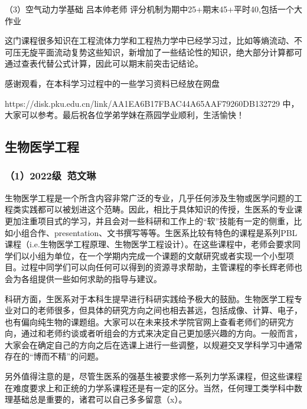 \documentclass[11pt,oneside]{book}
\begin{document}
\vspace{10pt}

（3）空气动力学基础 吕本帅老师
评分机制为期中25+期末45+平时40,包括一个大作业

\vspace{10pt}

这门课程很多知识在工程流体力学和工程热力学中已经学习过，比如等熵流动、不可压无旋平面流动复势这些知识，新增加了一些结论性的知识，绝大部分计算都可通过查表代替公式计算，因此可以期末前突击记结论。

\vspace{10pt}

感谢观看，在本科学习过程中的一些学习资料已经放在网盘

https://disk.pku.edu.cn/link/AA1EA6B17FBAC44A65AAF79260DB132729
中，大家可以参考。最后祝各位学弟学妹在燕园学业顺利，生活愉快！

\subsection{生物医学工程}
\subsubsection{（1）2022级\ 范文琳}

生物医学工程是一个所含内容非常广泛的专业，几乎任何涉及生物或医学问题的工程类实践都可以被划进这个范畴。因此，相比于具体知识的传授，生医系的专业课更加注重项目式的学习，并且会对一些科研和工作上的“软”技能有一定的侧重，比如小组合作、presentation、文书撰写等等。生医系比较有特色的课程是系列PBL课程（i.e.生物医学工程原理、生物医学工程设计）。在这些课程中，老师会要求同学们以小组为单位，在一个学期内完成一个课题的文献研究或者实现一个小型项目。过程中同学们可以向任何可以得到的资源寻求帮助，主管课程的李长辉老师也会为各组提供一些如何求助的指导与建议。

\vspace{10pt}

科研方面，生医系对于本科生提早进行科研实践给予极大的鼓励。生物医学工程专业对口的老师很多，但具体的研究方向之间也相去甚远，包括成像、计算、电子，也有偏向纯生物的课题组。大家可以在未来技术学院官网上查看老师们的研究方向，通过和老师约谈或者听组会的方式来决定自己更加感兴趣的方向。一般而言，大家会在确定自己的方向之后在选课上进行一些调整，以规避交叉学科学习中通常存在的“博而不精”的问题。

\vspace{10pt}

另外值得注意的是，尽管生医系的强基生被要求修一系列力学系课程，但这些课程在难度要求上和正统的力学系课程还是有一定的区分。当然，任何理工类学科中数理基础总是重要的，诸君可以自己多多留意（x）。
\end{document}
